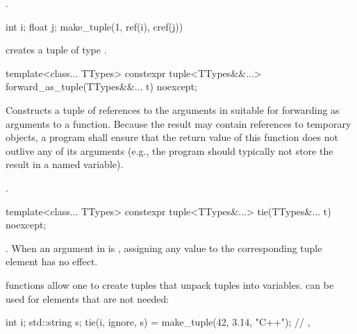 \begin{itemdescr}
\pnum
\returns
{}.

\pnum
\begin{example}
\begin{codeblock}
int i; float j;
make_tuple(1, ref(i), cref(j))
\end{codeblock}
creates a tuple of type .
\end{example}
\end{itemdescr}

%
%
\begin{itemdecl}
template<class... TTypes>
  constexpr tuple<TTypes&&...> forward_as_tuple(TTypes&&... t) noexcept;
\end{itemdecl}

\begin{itemdescr}
\pnum
\effects
Constructs a tuple of references to the arguments in  suitable
for forwarding as arguments to a function. Because the result may contain references
to temporary objects, a program shall ensure that the return value of this
function does not outlive any of its arguments (e.g., the program should typically
not store the result in a named variable).

\pnum
\returns
{}.
\end{itemdescr}

%
%
%
\begin{itemdecl}
template<class... TTypes>
  constexpr tuple<TTypes&...> tie(TTypes&... t) noexcept;
\end{itemdecl}

\begin{itemdescr}
\pnum
\returns
{}.  When an
argument in  is , assigning
any value to the corresponding tuple element has no effect.

\pnum
\begin{example}
 functions allow one to create tuples that unpack
tuples into variables.  can be used for elements that
are not needed:
\begin{codeblock}
int i; std::string s;
tie(i, ignore, s) = make_tuple(42, 3.14, "C++");
// , 
\end{codeblock}
\end{example}
\end{itemdescr}

